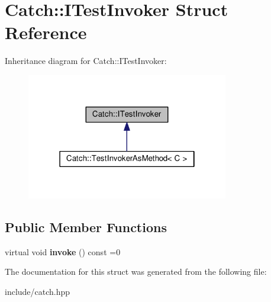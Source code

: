 \hypertarget{structCatch_1_1ITestInvoker}{}\section{Catch\+:\+:I\+Test\+Invoker Struct Reference}
\label{structCatch_1_1ITestInvoker}


Inheritance diagram for Catch\+:\+:I\+Test\+Invoker\+:\nopagebreak
\begin{figure}[H]
\begin{center}
\leavevmode
\includegraphics[width=250pt]{structCatch_1_1ITestInvoker__inherit__graph}
\end{center}
\end{figure}
\subsection*{Public Member Functions}
\begin{DoxyCompactItemize}
\item 
virtual void {\bfseries invoke} () const =0\hypertarget{structCatch_1_1ITestInvoker_a6fcd5c5b67d6d5ade6491ff33411ca7f}{}\label{structCatch_1_1ITestInvoker_a6fcd5c5b67d6d5ade6491ff33411ca7f}

\end{DoxyCompactItemize}


The documentation for this struct was generated from the following file\+:\begin{DoxyCompactItemize}
\item 
include/catch.\+hpp\end{DoxyCompactItemize}
